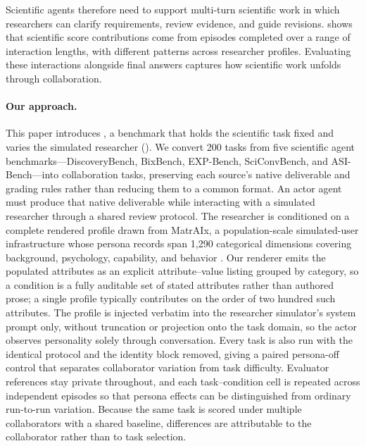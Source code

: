 Scientific agents therefore need to support multi-turn scientific work in which researchers
can clarify requirements, review evidence, and guide revisions.
 shows that scientific score contributions
come from episodes completed over a range of interaction lengths, with
different patterns across researcher profiles. Evaluating these interactions
alongside final answers captures how scientific work unfolds through
collaboration.



\paragraph{Our approach.}
This paper introduces \benchmark, a benchmark that holds the scientific
task fixed and varies the simulated researcher ().
We convert 200 tasks from
five scientific agent benchmarks---DiscoveryBench, BixBench, EXP-Bench,
SciConvBench, and ASI-Bench---into collaboration tasks, preserving each
source's native deliverable and grading rules rather than reducing them to
a common format. An actor agent must produce that native deliverable while
interacting with a simulated researcher through a shared review protocol.
The researcher is conditioned on a complete rendered profile drawn from
MatrAIx, a population-scale simulated-user infrastructure whose persona
records span 1,290 categorical dimensions covering background, psychology,
capability, and behavior \cite{li2026matraix}. Our renderer emits the
populated attributes as an explicit attribute--value listing grouped by
category, so a condition is a fully auditable set of stated attributes rather
than authored prose; a single profile typically contributes on the order of two
hundred such attributes. The profile is injected verbatim into the researcher
simulator's system prompt only, without truncation or projection onto the
task domain, so the actor observes personality solely through conversation.
Every task is also run with the identical protocol and the
identity block removed, giving a paired persona-off control that separates
collaborator variation from task difficulty. Evaluator references stay
private throughout, and each task--condition cell is repeated across
independent episodes so that persona effects can be distinguished from
ordinary run-to-run variation. Because the same task is scored under
multiple collaborators with a shared baseline, differences are attributable
to the collaborator rather than to task selection.

